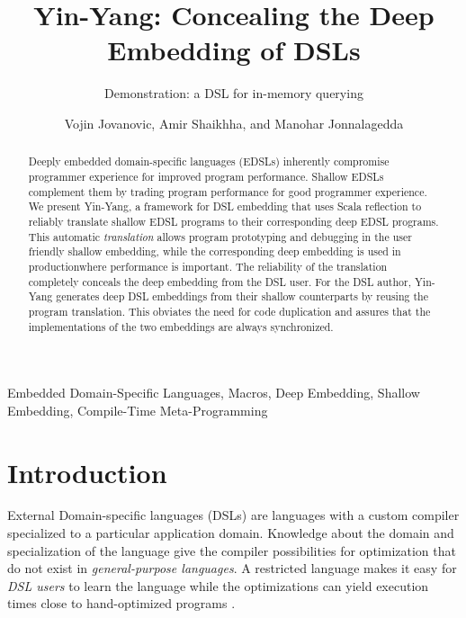 \documentclass{llncs}
\begin{document}
\title{Yin-Yang: Concealing the Deep Embedding of DSLs}
\subtitle{Demonstration: a DSL for in-memory querying}

\author{Vojin Jovanovic, Amir Shaikhha, and Manohar Jonnalagedda}


\maketitle

\begin{abstract}
Deeply embedded domain-specific languages (EDSLs) inherently compromise programmer experience for improved program performance. Shallow EDSLs complement them by trading program performance for good programmer experience. We present Yin-Yang, a framework for DSL embedding that uses Scala reflection to reliably translate shallow EDSL programs to their corresponding deep EDSL programs. This automatic \emph{translation} allows program prototyping and debugging in the user friendly shallow embedding, while the corresponding deep embedding is used in production\textemdash where performance is important. The reliability of the translation completely conceals the deep embedding from the DSL user. For the DSL author, Yin-Yang generates deep DSL embeddings from their shallow counterparts by reusing the program translation. This obviates the need for code duplication and assures that the implementations of the two embeddings are always synchronized.
\end{abstract}

\keywords
Embedded Domain-Specific Languages, Macros, Deep Embedding, Shallow Embedding, Compile-Time Meta-Programming

\section{Introduction}

External Domain-specific languages (DSLs) are languages with a custom compiler specialized to a particular application domain. Knowledge about the domain and specialization of the language give the compiler possibilities for optimization that do not exist in \emph{general-purpose languages}. A restricted language makes it easy for \emph{DSL users} to learn the language while the optimizations can yield execution times close to hand-optimized programs \cite{rompf_optimizing_2013}.
\end{document}
